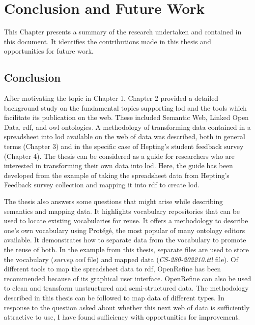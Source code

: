
\chapter{Conclusion and Future Work}
\label{chap:conclusion}

\begin{doublespace}

This Chapter presents a summary of the research undertaken and 
contained in this document.
It identifies the contributions made in this thesis and opportunities for future work.

\section{Conclusion}
\label{sec:conclusion}

After motivating the topic in Chapter 1,
Chapter 2 provided a detailed background study on the fundamental topics
supporting \ac{lod} and the tools which facilitate its publication on the web.
These included 
Semantic Web, 
Linked Open Data, 
\ac{rdf}, and 
\ac{owl} ontologies. 
A methodology of transforming data contained in a spreadsheet
into \ac{lod} available on the web of data was described, 
both in general terms (Chapter 3) 
and in the specific case of Hepting's student feedback survey (Chapter 4).
The thesis can be considered as a guide for researchers who are interested in 
transforming their own data into \ac{lod}. 
Here, the guide has been developed from the example of taking the spreadsheet data 
from Hepting's Feedback survey collection and mapping it into \ac{rdf} to create \ac{lod}. 

The thesis also answers some questions that might arise 
while describing semantics and mapping data. 
It highlights vocabulary repositories that can be used to locate existing vocabularies for reuse. 
It offers a methodology to describe one's own vocabulary using Protégé,
the most popular of many ontology editors available. 
It demonstrates how to separate data from the vocabulary to promote the reuse of both. 
In the example from this thesis, separate files are used to store the
vocabulary (\emph{survey.owl} file) and mapped data (\emph{CS-280-202210.ttl} file). 
Of different tools to map the spreadsheet data to \ac{rdf}, OpenRefine has been recommended
because of its graphical user interface.
OpenRefine can also be used to clean and transform unstructured and semi-structured data. 
The methodology described in this thesis can be followed to map data of different types.
In response to the question asked about whether this next web of data is sufficiently attractive to use,
I have found sufficiency with opportunities for improvement.


\end{doublespace}
